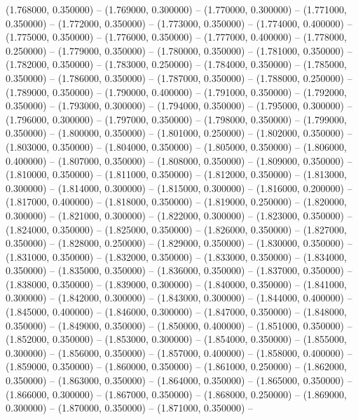 (1.768000, 0.350000) -- 
(1.769000, 0.300000) -- 
(1.770000, 0.300000) -- 
(1.771000, 0.350000) -- 
(1.772000, 0.350000) -- 
(1.773000, 0.350000) -- 
(1.774000, 0.400000) -- 
(1.775000, 0.350000) -- 
(1.776000, 0.350000) -- 
(1.777000, 0.400000) -- 
(1.778000, 0.250000) -- 
(1.779000, 0.350000) -- 
(1.780000, 0.350000) -- 
(1.781000, 0.350000) -- 
(1.782000, 0.350000) -- 
(1.783000, 0.250000) -- 
(1.784000, 0.350000) -- 
(1.785000, 0.350000) -- 
(1.786000, 0.350000) -- 
(1.787000, 0.350000) -- 
(1.788000, 0.250000) -- 
(1.789000, 0.350000) -- 
(1.790000, 0.400000) -- 
(1.791000, 0.350000) -- 
(1.792000, 0.350000) -- 
(1.793000, 0.300000) -- 
(1.794000, 0.350000) -- 
(1.795000, 0.300000) -- 
(1.796000, 0.300000) -- 
(1.797000, 0.350000) -- 
(1.798000, 0.350000) -- 
(1.799000, 0.350000) -- 
(1.800000, 0.350000) -- 
(1.801000, 0.250000) -- 
(1.802000, 0.350000) -- 
(1.803000, 0.350000) -- 
(1.804000, 0.350000) -- 
(1.805000, 0.350000) -- 
(1.806000, 0.400000) -- 
(1.807000, 0.350000) -- 
(1.808000, 0.350000) -- 
(1.809000, 0.350000) -- 
(1.810000, 0.350000) -- 
(1.811000, 0.350000) -- 
(1.812000, 0.350000) -- 
(1.813000, 0.300000) -- 
(1.814000, 0.300000) -- 
(1.815000, 0.300000) -- 
(1.816000, 0.200000) -- 
(1.817000, 0.400000) -- 
(1.818000, 0.350000) -- 
(1.819000, 0.250000) -- 
(1.820000, 0.300000) -- 
(1.821000, 0.300000) -- 
(1.822000, 0.300000) -- 
(1.823000, 0.350000) -- 
(1.824000, 0.350000) -- 
(1.825000, 0.350000) -- 
(1.826000, 0.350000) -- 
(1.827000, 0.350000) -- 
(1.828000, 0.250000) -- 
(1.829000, 0.350000) -- 
(1.830000, 0.350000) -- 
(1.831000, 0.350000) -- 
(1.832000, 0.350000) -- 
(1.833000, 0.350000) -- 
(1.834000, 0.350000) -- 
(1.835000, 0.350000) -- 
(1.836000, 0.350000) -- 
(1.837000, 0.350000) -- 
(1.838000, 0.350000) -- 
(1.839000, 0.300000) -- 
(1.840000, 0.350000) -- 
(1.841000, 0.300000) -- 
(1.842000, 0.300000) -- 
(1.843000, 0.300000) -- 
(1.844000, 0.400000) -- 
(1.845000, 0.400000) -- 
(1.846000, 0.300000) -- 
(1.847000, 0.350000) -- 
(1.848000, 0.350000) -- 
(1.849000, 0.350000) -- 
(1.850000, 0.400000) -- 
(1.851000, 0.350000) -- 
(1.852000, 0.350000) -- 
(1.853000, 0.300000) -- 
(1.854000, 0.350000) -- 
(1.855000, 0.300000) -- 
(1.856000, 0.350000) -- 
(1.857000, 0.400000) -- 
(1.858000, 0.400000) -- 
(1.859000, 0.350000) -- 
(1.860000, 0.350000) -- 
(1.861000, 0.250000) -- 
(1.862000, 0.350000) -- 
(1.863000, 0.350000) -- 
(1.864000, 0.350000) -- 
(1.865000, 0.350000) -- 
(1.866000, 0.300000) -- 
(1.867000, 0.350000) -- 
(1.868000, 0.250000) -- 
(1.869000, 0.300000) -- 
(1.870000, 0.350000) -- 
(1.871000, 0.350000) -- 
